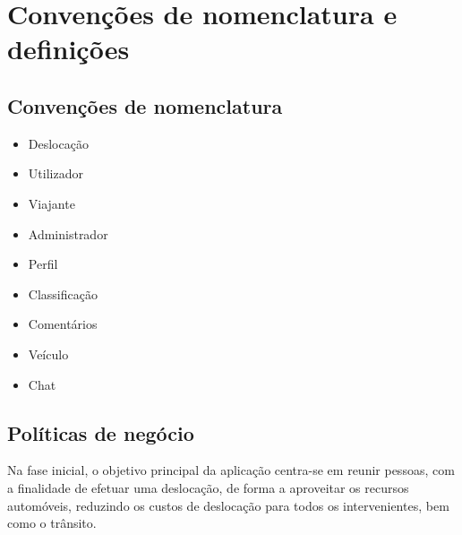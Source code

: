 \chapter{Convenções de nomenclatura e definições}

\section{Convenções de nomenclatura}
\begin{itemize}
    \item Deslocação
    \item Utilizador
    \item Viajante
    \item Administrador
    \item Perfil
    \item Classificação
    \item Comentários
    \item Veículo
    \item Chat 
\end{itemize}{}

\section{Políticas de negócio}
\hspace{5mm} Na fase inicial, o objetivo principal da aplicação centra-se em reunir pessoas, com a finalidade de efetuar uma deslocação, de forma a aproveitar os recursos automóveis, reduzindo os custos de deslocação para todos os intervenientes, bem como o trânsito. 

